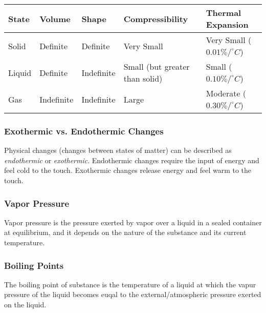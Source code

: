 \begin{table}[H]
\centering
\begin{tabular}{|l|l|l|l|l|}
\hline
State & Volume & Shape & Compressibility & Thermal Expansion \\
\hline
Solid & Definite & Definite & Very Small & Very Small ($0.01\%/^\circ C$) \\
Liquid & Definite & Indefinite & Small (but greater than solid) & Small ($0.10\%/^\circ C$) \\
Gas & Indefinite & Indefinite & Large & Moderate ($0.30\%/^\circ C$) \\
\hline
\end{tabular}
\end{table}

\subsubsection{Exothermic vs. Endothermic Changes}

\begin{defn}
Physical changes (changes between states of matter) can be described as \textit{endothermic} or \textit{exothermic}. Endothermic changes require the input of energy and feel cold to the touch. Exothermic changes release energy and feel warm to the touch.
\end{defn}

\subsubsection{Vapor Pressure}

\begin{defn}
Vapor pressure is the pressure exerted by vapor over a liquid in a sealed container at equilibrium, and it depends on the nature of the substance and its current temperature.
\end{defn}


\subsubsection{Boiling Points}

\begin{defn}
The boiling point of substance is the temperature of a liquid at which the vapur pressure of the liquid becomes euqal to the external/atmospheric pressure exerted on the liquid.
\end{defn}

